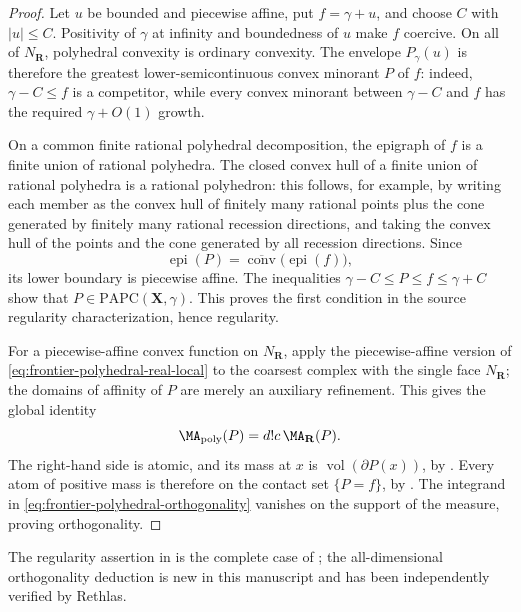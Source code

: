 \begin{proof}
Let \(u\) be bounded and piecewise affine, put \(f=\gamma+u\), and choose
\(C\) with \(|u|\leq C\).  Positivity of \(\gamma\) at infinity and
boundedness of \(u\) make \(f\) coercive.  On all of
\(N_{\mathbf R}\), polyhedral
convexity is ordinary convexity.  The envelope \(P_\gamma(u)\) is therefore
the greatest lower-semicontinuous convex minorant \(P\) of \(f\): indeed,
\(\gamma-C\leq f\) is a competitor, while every convex minorant between
\(\gamma-C\) and \(f\) has the required \(\gamma+O(1)\) growth.

On a common finite rational polyhedral decomposition, the epigraph of
\(f\) is a finite union of rational polyhedra.  The closed convex hull of a
finite union of rational polyhedra is a rational polyhedron: this follows,
for example, by writing each member as the convex hull of finitely many
rational points plus the cone generated by finitely many rational recession
directions, and taking the convex hull of the points and the cone generated
by all recession directions.  Since
\[
 \operatorname{epi}(P)
 =\overline{\operatorname{conv}}\bigl(\operatorname{epi}(f)\bigr),
\]
its lower boundary is piecewise affine.  The inequalities
\(
 \gamma-C\leq P\leq f\leq\gamma+C
\)
show that \(P\in\mathrm{PAPC}(\mathbf X,\gamma)\).  This proves the first
condition in the source regularity characterization, hence regularity.

For a piecewise-affine convex function on \(N_{\mathbf R}\), apply the
piecewise-affine version of
\eqref{eq:frontier-polyhedral-real-local} to the coarsest complex with the
single face \(N_{\mathbf R}\); the domains of affinity of \(P\) are merely
an auxiliary refinement.  This gives the global identity
\begin{equation}
                  \MA_{\mathrm{poly}}(P)
                  =d!c\,\MA_{\mathbf R}(P).
 \label{eq:frontier-polyhedral-affine-global-ma}
\end{equation}
The right-hand side is atomic, and its mass at \(x\) is
\(\operatorname{vol}(\partial P(x))\), by
.  Every atom of positive mass is therefore
on the contact set \(\{P=f\}\), by
.  The integrand in
\eqref{eq:frontier-polyhedral-orthogonality} vanishes on the support of the
measure, proving orthogonality.
\end{proof}

The regularity assertion in
 is the complete case of
\cite[Remark~6.6]{BMPS26}; the all-dimensional orthogonality deduction is
new in this manuscript and has been independently verified by Rethlas.

